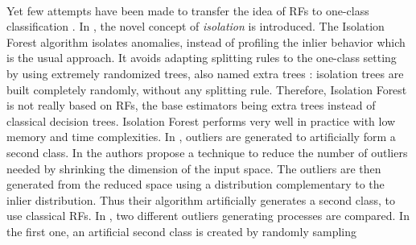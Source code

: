 \paragraph{}
Yet few attempts have been made to transfer the idea of \acp{RF} to one-class
classification \citep{Desir13, Liu2008, Shi2012}.
%
In \citet{Liu2008}, the novel concept of \emph{isolation} is introduced. The
Isolation Forest algorithm isolates anomalies, instead of profiling the inlier
behavior which is the usual approach. It avoids adapting splitting rules to
the one-class setting by using extremely randomized trees, also named extra
trees \citep{Geurts2006}: isolation trees are built completely randomly,
without any splitting rule. 
Therefore, Isolation Forest is not really based on \acp{RF}, the base
estimators being extra trees instead of classical decision trees. Isolation
Forest performs very well in practice with low memory and time complexities.
In \citet{Desir13, Shi2012}, outliers are generated to artificially form a
second class.
%
In \citet{Desir13} the authors propose a technique to reduce the number of
outliers needed by shrinking the dimension of the input space. The outliers
are then generated from the reduced space using a distribution complementary
to the inlier distribution. Thus their algorithm artificially generates a
second class, to use classical \acp{RF}.
%
In \citet{Shi2012}, two different outliers generating processes are compared.
In the first one, an artificial second class is created by randomly sampling
